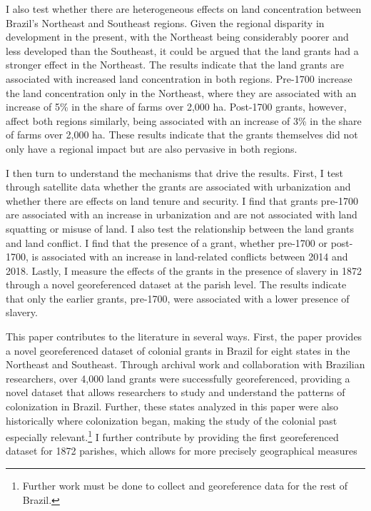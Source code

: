 \documentclass[11pt]{article}
\begin{document}
I also test whether there are heterogeneous effects on land concentration between Brazil's Northeast and Southeast regions. 
Given the regional disparity in development in the present, with the Northeast being considerably poorer and less developed than the Southeast, it could be argued that the land grants had a stronger effect in the Northeast.
The results indicate that the land grants are associated with increased land concentration in both regions. 
Pre-1700 increase the land concentration only in the Northeast, where they are associated with an increase of 5\% in the share of farms over 2,000 ha.
Post-1700 grants, however, affect both regions similarly, being associated with an increase of 3\% in the share of farms over 2,000 ha. 
These results indicate that the grants themselves did not only have a regional impact but are also pervasive in both regions.

I then turn to understand the mechanisms that drive the results. 
First, I test through satellite data whether the grants are associated with urbanization and whether there are effects on land tenure and security.
I find that grants pre-1700 are associated with an increase in urbanization and are not associated with land squatting or misuse of land.
I also test the relationship between the land grants and land conflict.
I find that the presence of a grant, whether pre-1700 or post-1700, is associated with an increase in land-related conflicts between 2014 and 2018.
Lastly, I measure the effects of the grants in the presence of slavery in 1872 through a novel georeferenced dataset at the parish level. 
The results indicate that only the earlier grants, pre-1700, were associated with a lower presence of slavery.

This paper contributes to the literature in several ways. 
First, the paper provides a novel georeferenced dataset of colonial grants in Brazil for eight states in the Northeast and Southeast.
Through archival work and collaboration with Brazilian researchers, over 4,000 land grants were successfully georeferenced, providing a novel dataset that allows researchers to study and understand the patterns of colonization in Brazil.
Further, these states analyzed in this paper were also historically where colonization began, making the study of the colonial past especially relevant.\footnote{Further work must be done to collect and georeference data for the rest of Brazil.}
I further contribute by providing the first georeferenced dataset for 1872 parishes, which allows for more precisely geographical measures 
\end{document}
